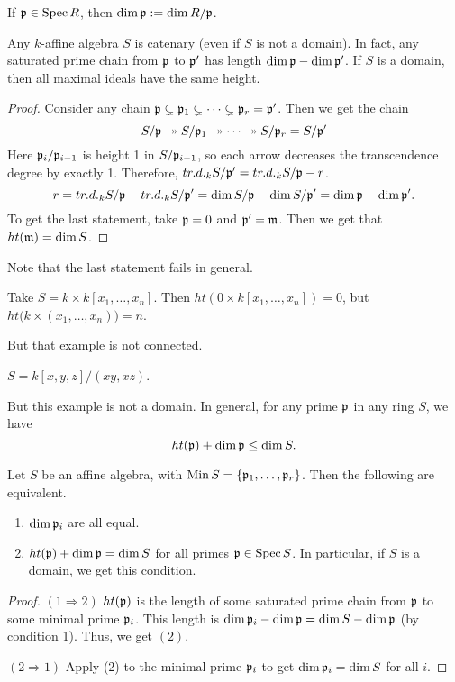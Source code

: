  \begin{definition}
   If $\mathfrak{p}\in \operatorname{Spec} R$, then $\dim \mathfrak{p}:= \dim R/\mathfrak{p}$.
 \end{definition}
 \begin{theorem}
   Any $k$-affine algebra $S$ is catenary (even if $S$ is not a domain). In fact, any
   saturated prime chain from $\mathfrak{p}$ to $\mathfrak{p}'$ has length $\dim \mathfrak{p} - \dim \mathfrak{p}'$. If $S$ is a
   domain, then all maximal ideals have the same height.
 \end{theorem}
 \begin{proof}
   Consider any chain $\mathfrak{p}\subsetneq \mathfrak{p}_1\subsetneq \cdots \subsetneq \mathfrak{p}_r = \mathfrak{p}'$. Then we
   get the chain
   \[
    S/\mathfrak{p} \twoheadrightarrow S/\mathfrak{p}_1 \twoheadrightarrow \cdots \twoheadrightarrow S/\mathfrak{p}_r
    = S/\mathfrak{p}'
   \]
   Here $\mathfrak{p}_i/\mathfrak{p}_{i-1}$ is height 1 in $S/\mathfrak{p}_{i-1}$, so each arrow decreases the
   transcendence degree by exactly 1. Therefore, $tr.d._k S/\mathfrak{p}' = tr.d._k S/\mathfrak{p} -r$.
   \[
    r = tr.d._k S/\mathfrak{p} - tr.d._k S/\mathfrak{p}' = \dim S/\mathfrak{p} - \dim S/\mathfrak{p}' = \dim \mathfrak{p}-\dim \mathfrak{p}'.
   \]
   To get the last statement, take $\mathfrak{p}=0$ and $\mathfrak{p}'=\mathfrak{m}$. Then we get that $ht(\mathfrak{m})=\dim S$.
 \end{proof}
 Note that the last statement fails in general.
 \begin{example}
   Take $S=k\times k[x_1,\dots, x_n]$. Then $ht(0\times k[x_1,\dots, x_n])=0$, but
   $ht\bigl(k\times (x_1,\dots, x_n)\bigr) = n$.
 \end{example}
 But that example is not connected.
 \begin{example}
   $S = k[x,y,z]/(xy,xz)$.
 \end{example}
 But this example is not a domain. In general, for any prime $\mathfrak{p}$ in any ring $S$, we
 have
 \[
    ht(\mathfrak{p}) + \dim \mathfrak{p} \le \dim S.
 \]
 \begin{theorem}
   Let $S$ be an affine algebra, with $\operatorname{Min} S = \{\mathfrak{p}_1,\dots, \mathfrak{p}_r\}$. Then the following
   are equivalent.
   \begin{enumerate}
     \item $\dim \mathfrak{p}_i$ are all equal.
     \item $ht(\mathfrak{p})+\dim \mathfrak{p} =\dim S$ for all primes $\mathfrak{p}\in \operatorname{Spec} S$. In particular, if $S$
     is a domain, we get this condition.
   \end{enumerate}
 \end{theorem}
 \begin{proof}
   $(1\Rightarrow 2)$ $ht(\mathfrak{p})$ is the length of some saturated prime chain from $\mathfrak{p}$ to
   some minimal prime $\mathfrak{p}_i$. This length is $\dim \mathfrak{p}_i - \dim \mathfrak{p} = \dim S - \dim \mathfrak{p}$ (by
   condition 1). Thus, we get $(2)$.

   $(2\Rightarrow 1)$ Apply (2) to the minimal prime $\mathfrak{p}_i$ to get $\dim \mathfrak{p}_i=\dim S$ for
   all $i$.
 \end{proof}

